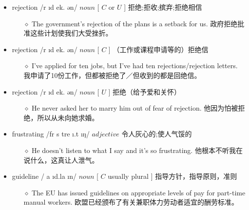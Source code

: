 \documentclass[a4paper,top=2.5cm,buttom=2.5cm10.5pt]{book}
\begin{document}
\begin{itemize}
\item rejection /r \i  \textprimstress d \textyogh ek. \textesh ən/ $ noun $ [  $ C $  or  $ U $  ] 拒绝;拒收;摈弃;拒绝相信
\begin{itemize}
\item[$\diamond$] The government's rejection of the plans is a setback for us.
政府拒绝批准这些计划使我们大受挫折。
\end{itemize}
\end{itemize}
\begin{itemize}
\item rejection /r \i  \textprimstress d \textyogh ek. \textesh ən/ $ noun $ [  $ C $  ] （工作或课程申请等的）拒绝信
\begin{itemize}
\item[$\diamond$] I've applied for ten jobs, but I've had ten rejections/rejection letters.
我申请了10份工作，但都被拒绝了／但收到的都是回绝信。
\end{itemize}
\end{itemize}
\begin{itemize}
\item rejection /r \i  \textprimstress d \textyogh ek. \textesh ən/ $ noun $ [  $ U $  ] 拒绝（给予爱和关怀）
\begin{itemize}
\item[$\diamond$] He never asked her to marry him out of fear of rejection.
他因为怕被拒绝，所以从未向她求婚。
\end{itemize}
\end{itemize}
\begin{itemize}
\item frustrating /fr \textturnv s \textprimstress tre \i .t \i ŋ/ $ adjective $  令人灰心的;使人气馁的
\begin{itemize}
\item[$\diamond$] He doesn't listen to what I say and it's so frustrating.
他根本不听我在说什么，这真让人泄气。
\end{itemize}
\end{itemize}
\begin{itemize}
\item guideline / \textprimstress  \textscriptg a \i d.la \i n/ $ noun $ [  $ C $  usually plural ] 指导方针，指导原则，准则
\begin{itemize}
\item[$\diamond$] The EU has issued guidelines on appropriate levels of pay for part-time manual workers.
欧盟已经颁布了有关兼职体力劳动者适宜的酬劳标准。
\end{itemize}
\end{itemize}
\end{document}
